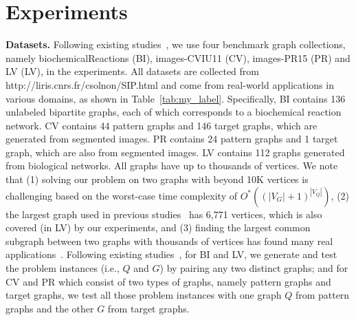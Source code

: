 \section{Experiments}
\label{sec:exp}
\noindent\textbf{Datasets.} {\YuiR Following existing studies~\cite{liu2023hybrid,zhoustrengthened,liu2020learning,mccreesh2017partitioning,solnon2015complexity,hoffmann2017between},} we use four benchmark graph collections, namely biochemicalReactions (\textsf{BI}), images-CVIU11 (\textsf{CV}), images-PR15 (\textsf{PR}) and LV (\textsf{LV}), in the experiments. All datasets are collected from http://liris.cnrs.fr/csolnon/SIP.html and come from real-world applications in various domains, {\Yui as shown in Table~\ref{tab:my_label}}. Specifically, \textsf{BI} contains 136 unlabeled bipartite graphs, each of which corresponds to a biochemical reaction network. \textsf{CV} contains 44 pattern graphs and 146 target graphs, which are generated from segmented images. \textsf{PR} contains 24 pattern graphs and 1 target graph, which are also from segmented images. \textsf{LV} contains 112 graphs generated from biological networks. 
%
{\YuiR All graphs have up to thousands of vertices. We note that (1) solving our problem on two graphs with beyond 10K vertices is challenging based on the worst-case time complexity of $O^*((|V_G|+1)^{|V_Q|})$, (2) the largest graph used in previous studies~\cite{liu2023hybrid,zhoustrengthened,liu2020learning,mccreesh2017partitioning} has 6,771 vertices, which is also covered (in LV) by our experiments, and (3) finding the largest common subgraph between two graphs with thousands of vertices has found many real applications~\cite{ehrlich2011maximum}.}
%
{\Yui Following existing studies~\cite{liu2023hybrid,zhoustrengthened,liu2020learning,mccreesh2017partitioning,solnon2015complexity,hoffmann2017between}}, for \textsf{BI} and \textsf{LV}, we generate and test the problem instances (i.e., $Q$ and $G$) by pairing any two distinct graphs; and for \textsf{CV} and \textsf{PR} {\revision which consist of two types of graphs, namely pattern graphs and target graphs}, we test all those problem instances with one graph $Q$ from pattern graphs and the other $G$ from target graphs.

